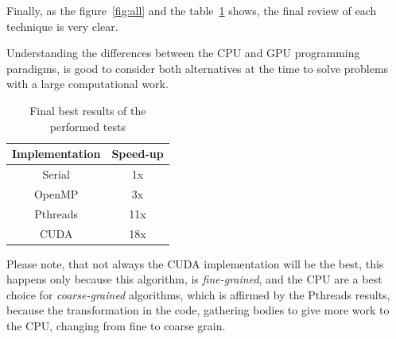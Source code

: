 Finally, as the figure~\ref{fig:all} and the table~\ref{tab:all} shows,
the final review of each technique is very clear.

Understanding the differences between the CPU and GPU
programming paradigms, is good to consider both alternatives
at the time to solve problems with a large computational work.

\begin{table}[h!t]
    \centering
    \begin{tabular}{|c|c|}
        \hline
        \textbf{Implementation} & \textbf{Speed-up} \\\hline
        Serial  & 1x  \\\hline
        OpenMP  & 3x  \\\hline
        Pthreads & 11x \\\hline
        CUDA    & 18x \\\hline
    \end{tabular}
    \label{tab:all}
    \caption{Final best results of the performed tests}
\end{table}

Please note, that not always the CUDA implementation
will be the best, this happens only because this algorithm,
is \emph{fine-grained}, and the CPU are a best choice for
\emph{coarse-grained} algorithms, which is affirmed
by the Pthreads results, because the transformation
in the code, gathering bodies to give more work to the CPU,
changing from fine to coarse grain.
